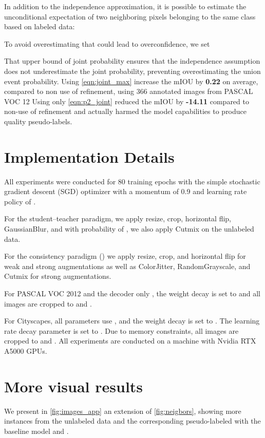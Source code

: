 \documentclass{article}
\renewcommand{\cite}[1]{\citep{#1}}
\begin{document}
In addition to the independence approximation, it is possible to estimate the unconditional expectation of two neighboring pixels belonging to the same class based on labeled data:


To avoid overestimating that could lead to overconfidence, we set  


That upper bound of joint probability ensures that the independence assumption does not underestimate the joint probability, preventing overestimating the union event probability.
Using \cref{eqn:joint_max} increase the mIOU by \textbf{0.22} on average, compared to non use of \methodname{} refinement, using 366 annotated images from PASCAL VOC 12 
Using only \cref{eqn:p2_joint} reduced the mIOU by \textbf{-14.11} compared to non-use of \methodname{} refinement and actually harmed the model capabilities to produce quality pseudo-labels.



\section{Implementation Details}\label{appendix:implementation}
All experiments were  conducted for 80 training epochs with the simple stochastic gradient descent (SGD) optimizer with a momentum of 0.9 and learning rate policy of .

For the student--teacher paradigm, we apply resize, crop, horizontal flip, GaussianBlur, and with probability of , we also apply Cutmix \cite{cutmix} on the unlabeled data.

For the consistency paradigm (\cite{sohn2020fixmatch,unimatch}) we apply resize, crop, and horizontal flip for weak and strong augmentations as well as  ColorJitter, RandomGrayscale, and Cutmix for strong augmentations.



For PASCAL VOC 2012  and the decoder only , the weight decay is set to  and all images are cropped to  and .

For Cityscapes, all parameters use , and the weight decay is set to . The learning rate decay parameter is set to
. Due to memory constraints, all images are cropped to  and .
All experiments are conducted on a machine with  Nvidia RTX A5000 GPUs.



\section{More visual results}\label{sec:visual_resutls}
We present in \cref{fig:images_app} an extension of \cref{fig:neigbors}, showing more instances from the unlabeled data and the corresponding pseudo-labeled with the baseline model and \methodname{}.
\end{document}

